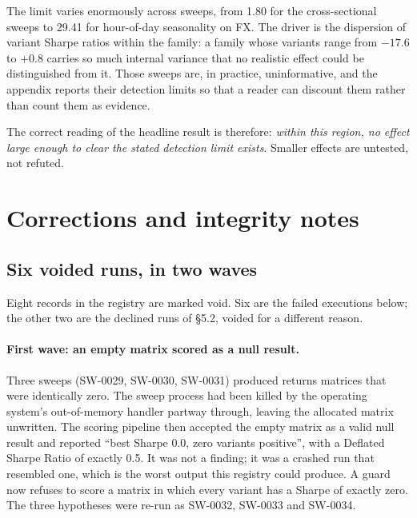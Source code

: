 \documentclass[11pt,a4paper]{article}
\begin{document}
The limit varies enormously across sweeps, from 1.80 for the cross-sectional
sweeps to 29.41 for hour-of-day seasonality on FX. The driver is the
dispersion of variant Sharpe ratios within the family: a family whose
variants range from $-17.6$ to $+0.8$ carries so much internal variance that
no realistic effect could be distinguished from it. Those sweeps are, in
practice, uninformative, and the appendix reports their detection limits so
that a reader can discount them rather than count them as evidence.

The correct reading of the headline result is therefore: \emph{within this
region, no effect large enough to clear the stated detection limit exists}.
Smaller effects are untested, not refuted.

\section{Corrections and integrity notes}
\label{sec:corrections}

\subsection{Six voided runs, in two waves}

Eight records in the registry are marked void. Six are the failed executions
below; the other two are the declined runs of \S5.2, voided for a different
reason.

\paragraph{First wave: an empty matrix scored as a null result.}
Three sweeps (SW-0029, SW-0030, SW-0031) produced returns matrices that were
identically zero. The sweep process had been killed by the operating system's
out-of-memory handler partway through, leaving the allocated matrix unwritten.
The scoring pipeline then accepted the empty matrix as a valid null result and
reported ``best Sharpe 0.0, zero variants positive'', with a Deflated Sharpe
Ratio of exactly 0.5. It was not a finding; it was a crashed run that
resembled one, which is the worst output this registry could produce. A guard
now refuses to score a matrix in which every variant has a Sharpe of exactly
zero. The three hypotheses were re-run as SW-0032, SW-0033 and SW-0034.
\end{document}
